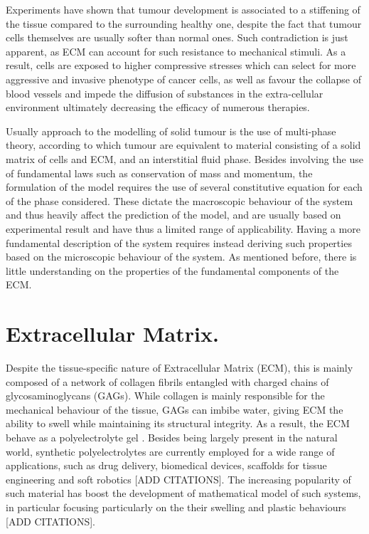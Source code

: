 \documentclass[runningheads]{llncs}
\begin{document}
Experiments have shown that tumour development is associated to a stiffening of the tissue compared to the surrounding healthy one, despite the fact that tumour cells themselves are usually softer than normal ones. Such contradiction is just apparent, as ECM can account for such resistance to mechanical stimuli. As a result, cells are exposed to higher compressive stresses which can select for more aggressive and invasive phenotype of cancer cells, as well as favour the collapse of blood vessels and impede the diffusion of substances in the extra-cellular environment ultimately decreasing the efficacy of numerous therapies.

Usually approach to the modelling of solid tumour is the use of multi-phase theory, according to which tumour are equivalent to material consisting of a solid matrix of cells and ECM, and an interstitial fluid phase. Besides involving the use of fundamental laws such as conservation of mass and momentum, the formulation of the model requires the use of several constitutive equation for each of the phase considered. These dictate the macroscopic behaviour of the system and thus heavily affect the prediction of the model, and are usually based on experimental result and have thus a limited range of applicability. Having a more fundamental description of the system requires instead deriving such properties based on the microscopic behaviour of the system.   As mentioned before, there is little understanding on the properties of the fundamental components of the ECM.

\section{Extracellular Matrix.}
Despite the tissue-specific nature of Extracellular Matrix (ECM), this is mainly composed of a network of collagen fibrils entangled with charged chains of glycosaminoglycans (GAGs). While collagen is mainly responsible for the mechanical behaviour of the tissue, GAGs can imbibe water, giving ECM the ability to swell while maintaining its structural integrity. As a result, the ECM behave as a polyelectrolyte gel \cite{ecm,ecm2}. Besides being largely present in the natural world, synthetic polyelectrolytes are currently employed for a wide range of applications, such as drug delivery, biomedical devices, scaffolds for tissue engineering and soft robotics [ADD CITATIONS]. The increasing popularity of such material has boost the development of mathematical model of such systems, in particular focusing particularly on the their swelling and plastic behaviours [ADD CITATIONS].
\end{document}
